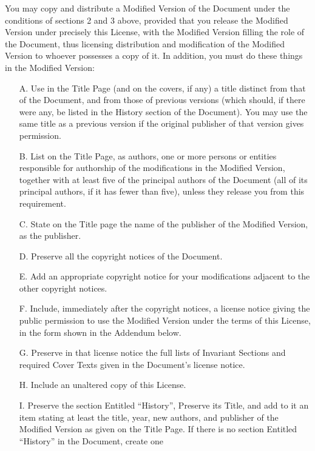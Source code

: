 You may copy and distribute a Modified Version of the Document under the
conditions of sections 2 and 3 above, provided that you release the Modified
Version under precisely this License, with the Modified Version filling the
role of the Document, thus licensing distribution and modification of the
Modified Version to whoever possesses a copy of it.  In addition, you must do
these things in the Modified Version:
%
\begin{itemize}
    \item[A.] Use in the Title Page (and on the covers, if any) a title
        distinct from that of the Document, and from those of previous
        versions (which should, if there were any, be listed in the History
        section of the Document).  You may use the same title as a previous
        version if the original publisher of that version gives permission.
    \item[B.] List on the Title Page, as authors, one or more persons or
        entities responsible for authorship of the modifications in the
        Modified Version, together with at least five of the principal
        authors of the Document (all of its principal authors, if it has
        fewer than five), unless they release you from this requirement.
    \item[C.] State on the Title page the name of the publisher of the
        Modified Version, as the publisher.
    \item[D.] Preserve all the copyright notices of the Document.
    \item[E.] Add an appropriate copyright notice for your modifications
        adjacent to the other copyright notices.
    \item[F.] Include, immediately after the copyright notices, a license
        notice giving the public permission to use the Modified Version under
        the terms of this License, in the form shown in the Addendum below.
    \item[G.] Preserve in that license notice the full lists of Invariant
        Sections and required Cover Texts given in the Document's license
        notice.
    \item[H.] Include an unaltered copy of this License.
    \item[I.] Preserve the section Entitled ``History'', Preserve its Title,
        and add to it an item stating at least the title, year, new authors,
        and publisher of the Modified Version as given on the Title Page.  If
        there is no section Entitled ``History'' in the Document, create one

\end{itemize}
